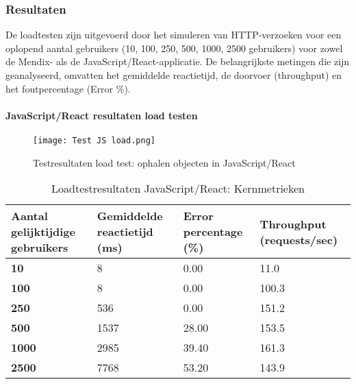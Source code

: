 \subsubsection{Resultaten}
De loadtesten zijn uitgevoerd door het simuleren van HTTP-verzoeken voor een oplopend aantal gebruikers (10, 100, 250, 500, 1000, 2500 gebruikers) voor zowel de Mendix- als de JavaScript/React-applicatie. De belangrijkste metingen die zijn geanalyseerd, omvatten het gemiddelde reactietijd, de doorvoer (throughput) en het foutpercentage (Error \%).

\paragraph{JavaScript/React resultaten load testen}

\begin{figure}[H]
    \centering
    \texttt{[image: Test JS load.png]}
    \caption[\centering Testresultaten load test: ophalen objecten in JavaScript/React]{\label{fig:loadtest-JavaScript} Testresultaten load test: ophalen objecten in JavaScript/React}
\end{figure}


\begin{table}[h]
    \centering
    \begin{tabular}{ |p{5cm}|p{3cm}|p{3cm}|p{3cm}|}
        \hline
        \textbf{Aantal gelijktijdige \newline gebruikers} & \textbf{Gemiddelde reactietijd (ms)} & \textbf{Error \newline percentage (\%)} & \textbf{Throughput (requests/sec)}\\
        \hline
        \textbf{10}  & 8 & 0.00 & 11.0 \\
        \hline
        \textbf{100} & 8 & 0.00 & 100.3 \\
        \hline
        \textbf{250}  & 536 & 0.00 & 151.2 \\
        \hline
        \textbf{500}  & 1537 & 28.00 & 153.5 \\
        \hline                       
        \textbf{1000}  & 2985 & 39.40 & 161.3  \\
        \hline
        \textbf{2500}  & 7768 & 53.20 & 143.9 \\
        \hline
    \end{tabular}
    \caption[\centering Loadtestresultaten JavaScript/React: Kernmetrieken]{\label{tab:Testresultaten JS loadtest}Loadtestresultaten JavaScript/React: Kernmetrieken}
\end{table}


